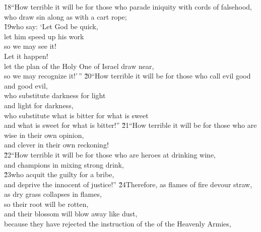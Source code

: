 \begin{poetry}
\poeml \v{18}``How terrible it will be for those who parade iniquity with cords of falsehood, \\
\poemll    who draw sin along as with a cart rope; \\
\poeml \v{19}who say: `Let God be quick, \\
\poemll    let him speed up his work \\
\poemlll       so we may see it! \\
\poeml Let it happen! \\
\poemll    let the plan of the Holy One of Israel draw near, \\
\poemlll       so we may recognize it!'\,''
\poeml \v{20}``How terrible it will be for those who call evil good \\
\poemll    and good evil, \\
\poeml who substitute darkness for light \\
\poemll    and light for darkness, \\
\poeml who substitute what is bitter for what is sweet \\
\poemll    and what is sweet for what is bitter!''
\poeml \v{21}``How terrible it will be for those who are wise in their own opinion, \\
\poemll    and clever in their own reckoning! \\
\poeml \v{22}``How terrible it will be for those who are heroes at drinking wine, \\
\poemll    and champions in mixing strong drink, \\
\poeml \v{23}who acquit the guilty for a bribe, \\
\poemll    and deprive the innocent of justice!''
\poeml \v{24}Therefore, as flames of fire devour straw, \\
\poemll    as dry grass collapses in flames, \\
\poeml so their root will be rotten, \\
\poemll    and their blossom will blow away like dust, \\
\poeml because they have rejected the instruction of the  of the Heavenly Armies, \\

\end{poetry}
